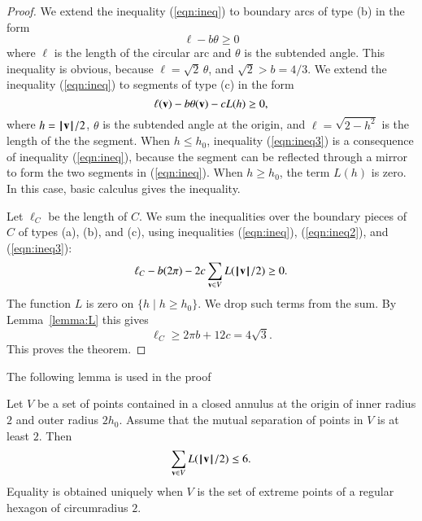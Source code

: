 \documentclass{llncs}
\begin{document}
\begin{proof}
We extend the inequality (\ref{eqn:ineq}) to boundary arcs of type (b) in the form
\begin{equation}\label{eqn:ineq2}
\ell - b \theta \ge 0
\end{equation}
where $\ell$ is the length of the circular arc and $\theta$ is the subtended angle.
This inequality is obvious, because $\ell = \sqrt2\,\theta$, and $\sqrt2>b = 4/3$.
We extend the inequality (\ref{eqn:ineq}) to segments of type (c) in the form
\begin{equation}\label{eqn:ineq3}
\ell({\mathbf v}) - b\theta({\mathbf v}) - c L(h) \ge 0,
\end{equation}
where $h ={{\hskip0.1em|\hskip-0.15em|\hskip0.1em}{\mathbf v}{\hskip0.1em|\hskip-0.15em|\hskip0.1em}}/2$, $\theta$ is the subtended angle at the origin, and $\ell = \sqrt{2-h^2}$
is the length of the the segment.  
When $h\le h_0$,  inequality (\ref{eqn:ineq3}) is a consequence of inequality (\ref{eqn:ineq}), because
the segment can be reflected through a mirror to form the two segments in (\ref{eqn:ineq}).
When $h\ge h_0$, the term $L(h)$ is zero.  In this case, basic calculus gives the inequality.

Let $\ell_C$ be the length of $C$.
We sum the inequalities over the boundary pieces of $C$ of types (a), (b), and (c),
using inequalities (\ref{eqn:ineq}), (\ref{eqn:ineq2}), and (\ref{eqn:ineq3}):
\[
\ell_C - b (2\pi) - 2 c \sum_{{\mathbf v}\in V} L({{\hskip0.1em|\hskip-0.15em|\hskip0.1em}{\mathbf v}{\hskip0.1em|\hskip-0.15em|\hskip0.1em}}/2) \ge 0.
\]
The function $L$ is zero on $\{h \mid h\ge h_0\}$.  We drop such terms from the sum.
By Lemma~\ref{lemma:L} this gives
\[
\ell_C \ge 2 \pi b + 12 c = 4\sqrt3.
\]
This proves the theorem.
\end{proof}

The following lemma is used in the proof

\begin{lemma}\label{lemma:L}
  Let $V$ be a set of points contained in a closed annulus at the
  origin of inner radius $2$ and outer radius $2h_0$.  Assume that
  the mutual separation of points in $V$ is at least $2$.  Then
\[
\sum_{{\mathbf v}\in V} L({{\hskip0.1em|\hskip-0.15em|\hskip0.1em}{\mathbf v}{\hskip0.1em|\hskip-0.15em|\hskip0.1em}}/2) \le 6.
\]
Equality is obtained uniquely when $V$ is the set of extreme points of a regular hexagon
of circumradius $2$.
\end{lemma}
\end{document}
